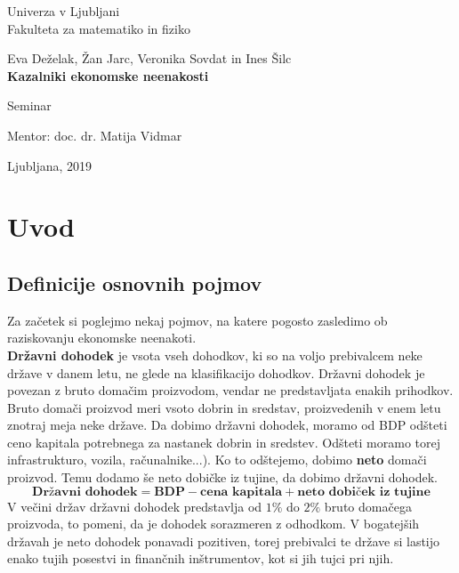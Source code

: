 \documentclass[a4paper,12 pt]{article}
\begin{document}
\begin{titlepage}
\begin{center}

\large
Univerza v Ljubljani\\
\normalsize
Fakulteta za matematiko in fiziko\\

\vspace{3 cm} 

\large
Eva Deželak, Žan Jarc, Veronika Sovdat in Ines Šilc\\

\vspace{0.5cm}
\LARGE
\textbf{Kazalniki ekonomske neenakosti}

\vspace{0.5 cm}
\normalsize
Seminar

\vspace{1.5cm}
\normalsize
Mentor: doc. dr. Matija Vidmar

\vspace{3cm}


\vfill

\large Ljubljana, 2019

\end{center}
\end{titlepage}

\newpage

\tableofcontents
\vspace{20mm}

\newpage

\section[Uvod]{Uvod}

\subsection[Definicije osnovnih pojmov]{Definicije osnovnih pojmov}
Za začetek si poglejmo nekaj pojmov, na katere pogosto zasledimo ob raziskovanju ekonomske neenakoti.
\\ 

\textbf{Državni dohodek} je vsota vseh dohodkov, ki so na voljo prebivalcem neke države v danem letu, ne glede na klasifikacijo dohodkov. Državni dohodek je povezan z bruto domačim proizvodom, vendar ne predstavljata enakih prihodkov. Bruto domači proizvod meri vsoto dobrin in sredstav, proizvedenih v enem letu znotraj meja neke države. Da dobimo državni dohodek, moramo od BDP odšteti ceno kapitala potrebnega za nastanek dobrin in sredstev. Odšteti moramo torej infrastrukturo, vozila, računalnike...). Ko to odštejemo, dobimo \textbf{neto} domači proizvod. Temu dodamo še neto dobičke iz tujine, da dobimo državni dohodek.
$$
\textbf{Državni dohodek} = \textbf{BDP} - \textbf{cena kapitala} + \textbf{neto dobiček iz tujine}
$$
V večini držav državni dohodek predstavlja od $1\%$ do $2\%$ bruto domačega proizvoda, to pomeni, da je dohodek sorazmeren z odhodkom. V bogatejših državah je neto dohodek ponavadi pozitiven, torej prebivalci te države si lastijo enako tujih posestvi in finančnih inštrumentov, kot si jih tujci pri njih.
\end{document}
